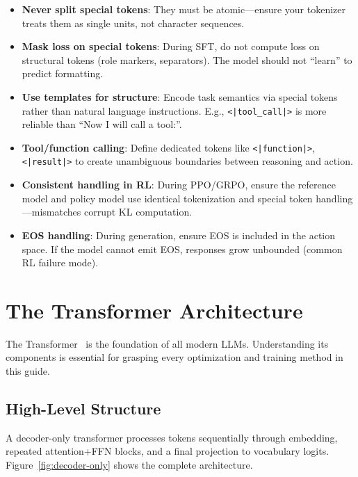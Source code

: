 \begin{keybox}
\begin{itemize}
  \item \textbf{Never split special tokens}: They must be atomic---ensure your tokenizer treats them as single units, not character sequences.
  \item \textbf{Mask loss on special tokens}: During SFT, do not compute loss on structural tokens (role markers, separators). The model should not ``learn'' to predict formatting.
  \item \textbf{Use templates for structure}: Encode task semantics via special tokens rather than natural language instructions. E.g., \texttt{<|tool\_call|>} is more reliable than ``Now I will call a tool:''.
  \item \textbf{Tool/function calling}: Define dedicated tokens like \texttt{<|function|>}, \texttt{<|result|>} to create unambiguous boundaries between reasoning and action.
  \item \textbf{Consistent handling in RL}: During PPO/GRPO, ensure the reference model and policy model use identical tokenization and special token handling---mismatches corrupt KL computation.
  \item \textbf{EOS handling}: During generation, ensure EOS is included in the action space. If the model cannot emit EOS, responses grow unbounded (common RL failure mode).
\end{itemize}
\end{keybox}

\section{The Transformer Architecture}
\label{the-transformer-architecture}

The Transformer~\cite{vaswani2017attention} is the foundation of all modern LLMs. Understanding its components is essential for grasping every optimization and training method in this guide.

\subsection{High-Level Structure}
\label{high-level-structure}

A decoder-only transformer processes tokens sequentially through embedding, repeated attention+FFN blocks, and a final projection to vocabulary logits. Figure~\ref{fig:decoder-only} shows the complete architecture.

